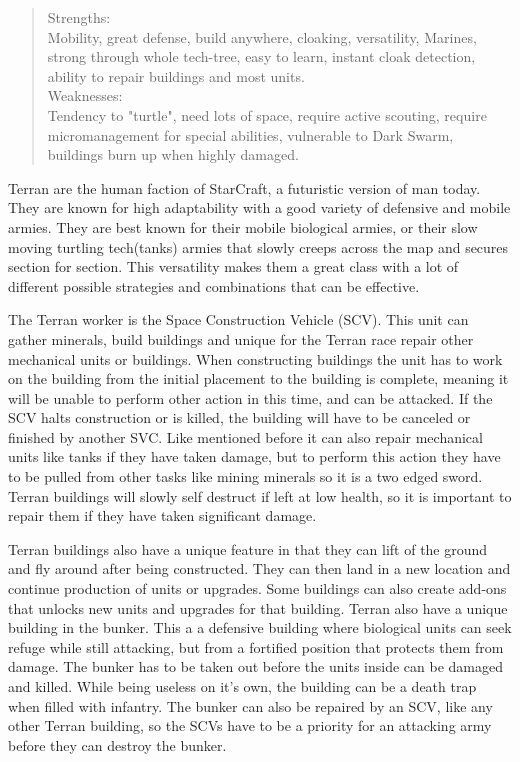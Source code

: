 \begin{quote}
Strengths: \\
Mobility, great defense, build anywhere, cloaking, versatility, Marines, strong through whole tech-tree, easy to learn, instant cloak detection, ability to repair buildings and most units. \\
Weaknesses: \\
Tendency to "turtle", need lots of space, require active scouting, require micromanagement for special abilities, vulnerable to Dark Swarm, buildings burn up when highly damaged. 


\cite{terranoverview}
\end{quote}

Terran are the human faction of StarCraft, a futuristic version of man today. They are known for high adaptability with a good variety of defensive and mobile armies. They are best known for their mobile biological armies, or their slow moving turtling tech(tanks) armies that slowly creeps across the map and secures section for section. This versatility makes them a great class with a lot of different possible strategies and combinations that can be effective. 

The Terran worker is the Space Construction Vehicle (SCV). This unit can gather minerals, build buildings and unique for the Terran race repair other mechanical units or buildings. When constructing buildings the unit has to work on the building from the initial placement to the building is complete, meaning it will be unable to perform other action in this time, and can be attacked. If the SCV halts construction or is killed, the building will have to be canceled or finished by another SVC. Like mentioned before it can also repair mechanical units like tanks if they have taken damage, but to perform this action they have to be pulled from other tasks like mining minerals so it is a two edged sword. Terran buildings will slowly self destruct if left at low health, so it is important to repair them if they have taken significant damage. 

Terran buildings also have a unique feature in that they can lift of the ground and fly around after being constructed. They can then land in a new location and continue production of units or upgrades. Some buildings can also create add-ons that unlocks new units and upgrades for that building. Terran also have a unique building in the bunker. This a a defensive building where  biological units can seek refuge while still attacking, but from a fortified position that protects them from damage. The bunker has to be taken out before the units inside can be damaged and killed. While being useless on it's own, the building can be a death trap when filled with infantry. The bunker can also be repaired by an SCV, like any other Terran building, so the SCVs have to be a priority for an attacking army before they can destroy the bunker. 

